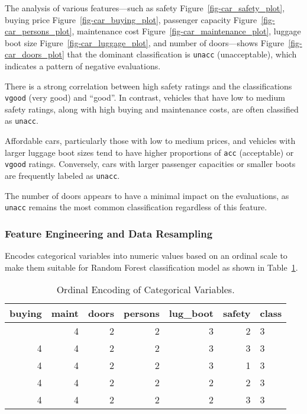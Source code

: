 \documentclass[
  letterpaper,
  DIV=11,
  numbers=noendperiod]{scrartcl}
\begin{document}
The analysis of various features---such as safety
Figure~\ref{fig-car_safety_plot}, buying price
Figure~\ref{fig-car_buying_plot}, passenger capacity
Figure~\ref{fig-car_persons_plot}, maintenance cost
Figure~\ref{fig-car_maintenance_plot}, luggage boot size
Figure~\ref{fig-car_luggage_plot}, and number of doors---shows
Figure~\ref{fig-car_doors_plot} that the dominant classification is
\texttt{unacc} (unacceptable), which indicates a pattern of negative
evaluations.

There is a strong correlation between high safety ratings and the
classifications \texttt{vgood} (very good) and ``good''. In contrast,
vehicles that have low to medium safety ratings, along with high buying
and maintenance costs, are often classified as \texttt{unacc}.

Affordable cars, particularly those with low to medium prices, and
vehicles with larger luggage boot sizes tend to have higher proportions
of \texttt{acc} (acceptable) or \texttt{vgood} ratings. Conversely, cars
with larger passenger capacities or smaller boots are frequently labeled
as \texttt{unacc}.

The number of doors appears to have a minimal impact on the evaluations,
as \texttt{unacc} remains the most common classification regardless of
this feature.

\subsubsection{Feature Engineering and Data
Resampling}\label{feature-engineering-and-data-resampling}

Encodes categorical variables into numeric values based on an ordinal
scale to make them suitable for Random Forest classification model as
shown in Table~\ref{tbl-encoded_variable}.

\begin{longtable}[]{@{}rrrrrrl@{}}

\caption{\label{tbl-encoded_variable}Ordinal Encoding of Categorical
Variables.}

\tabularnewline

\toprule\noalign{}
buying & maint & doors & persons & lug\_boot & safety & class \\
\midrule\noalign{}
\endhead
\bottomrule\noalign{}
\endlastfoot
4 & 4 & 2 & 2 & 3 & 2 & 3 \\
4 & 4 & 2 & 2 & 3 & 3 & 3 \\
4 & 4 & 2 & 2 & 3 & 1 & 3 \\
4 & 4 & 2 & 2 & 2 & 2 & 3 \\
4 & 4 & 2 & 2 & 2 & 3 & 3 \\

\end{longtable}
\end{document}

